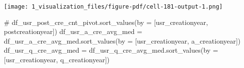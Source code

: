 \documentclass[
  letterpaper,
  DIV=11,
  numbers=noendperiod]{scrartcl}
\newenvironment{Shaded}{\begin{snugshade}}{\end{snugshade}}
\newcommand{\CommentTok}[1]{\textcolor[rgb]{0.37,0.37,0.37}{#1}}
\newcommand{\NormalTok}[1]{\textcolor[rgb]{0.00,0.23,0.31}{#1}}
\newcommand{\OperatorTok}[1]{\textcolor[rgb]{0.37,0.37,0.37}{#1}}
\newcommand{\StringTok}[1]{\textcolor[rgb]{0.13,0.47,0.30}{#1}}
\begin{document}
\texttt{[image: 1\_visualization\_files/figure-pdf/cell-181-output-1.png]}

\begin{Shaded}
\begin{Highlighting}[]
\CommentTok{\# df\_usr\_post\_cre\_cnt\_pivot.sort\_values(by = [\textquotesingle{}usr\_creationyear\textquotesingle{}, \textquotesingle{}postcreationyear\textquotesingle{}])}
\NormalTok{df\_usr\_a\_cre\_avg\_med }\OperatorTok{=}\NormalTok{ df\_usr\_a\_cre\_avg\_med.sort\_values(by }\OperatorTok{=}\NormalTok{ [}\StringTok{\textquotesingle{}usr\_creationyear\textquotesingle{}}\NormalTok{, }\StringTok{\textquotesingle{}a\_creationyear\textquotesingle{}}\NormalTok{])}
\NormalTok{df\_usr\_q\_cre\_avg\_med }\OperatorTok{=}\NormalTok{ df\_usr\_q\_cre\_avg\_med.sort\_values(by }\OperatorTok{=}\NormalTok{ [}\StringTok{\textquotesingle{}usr\_creationyear\textquotesingle{}}\NormalTok{, }\StringTok{\textquotesingle{}q\_creationyear\textquotesingle{}}\NormalTok{])}
\end{Highlighting}
\end{Shaded}
\end{document}
